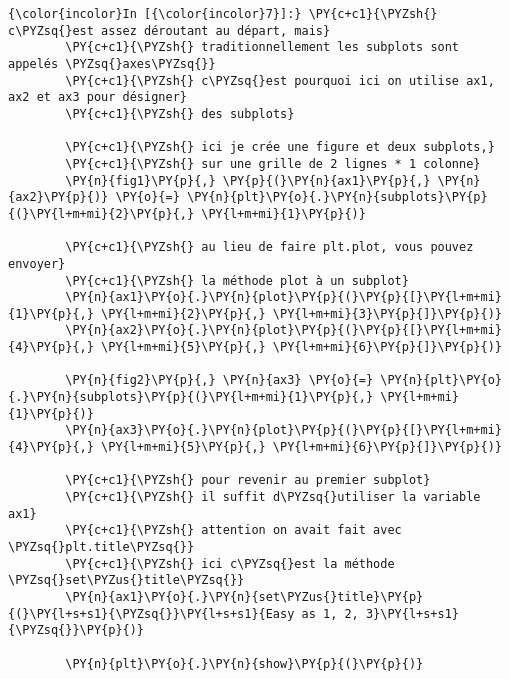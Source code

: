     \begin{Verbatim}[commandchars=\\\{\},frame=single,framerule=0.3mm,rulecolor=\color{cellframecolor}]
{\color{incolor}In [{\color{incolor}7}]:} \PY{c+c1}{\PYZsh{} c\PYZsq{}est assez déroutant au départ, mais}
        \PY{c+c1}{\PYZsh{} traditionnellement les subplots sont appelés \PYZsq{}axes\PYZsq{}}
        \PY{c+c1}{\PYZsh{} c\PYZsq{}est pourquoi ici on utilise ax1, ax2 et ax3 pour désigner}
        \PY{c+c1}{\PYZsh{} des subplots}
        
        \PY{c+c1}{\PYZsh{} ici je crée une figure et deux subplots,}
        \PY{c+c1}{\PYZsh{} sur une grille de 2 lignes * 1 colonne}
        \PY{n}{fig1}\PY{p}{,} \PY{p}{(}\PY{n}{ax1}\PY{p}{,} \PY{n}{ax2}\PY{p}{)} \PY{o}{=} \PY{n}{plt}\PY{o}{.}\PY{n}{subplots}\PY{p}{(}\PY{l+m+mi}{2}\PY{p}{,} \PY{l+m+mi}{1}\PY{p}{)}
        
        \PY{c+c1}{\PYZsh{} au lieu de faire plt.plot, vous pouvez envoyer}
        \PY{c+c1}{\PYZsh{} la méthode plot à un subplot}
        \PY{n}{ax1}\PY{o}{.}\PY{n}{plot}\PY{p}{(}\PY{p}{[}\PY{l+m+mi}{1}\PY{p}{,} \PY{l+m+mi}{2}\PY{p}{,} \PY{l+m+mi}{3}\PY{p}{]}\PY{p}{)}
        \PY{n}{ax2}\PY{o}{.}\PY{n}{plot}\PY{p}{(}\PY{p}{[}\PY{l+m+mi}{4}\PY{p}{,} \PY{l+m+mi}{5}\PY{p}{,} \PY{l+m+mi}{6}\PY{p}{]}\PY{p}{)}
        
        \PY{n}{fig2}\PY{p}{,} \PY{n}{ax3} \PY{o}{=} \PY{n}{plt}\PY{o}{.}\PY{n}{subplots}\PY{p}{(}\PY{l+m+mi}{1}\PY{p}{,} \PY{l+m+mi}{1}\PY{p}{)}
        \PY{n}{ax3}\PY{o}{.}\PY{n}{plot}\PY{p}{(}\PY{p}{[}\PY{l+m+mi}{4}\PY{p}{,} \PY{l+m+mi}{5}\PY{p}{,} \PY{l+m+mi}{6}\PY{p}{]}\PY{p}{)}
        
        \PY{c+c1}{\PYZsh{} pour revenir au premier subplot}
        \PY{c+c1}{\PYZsh{} il suffit d\PYZsq{}utiliser la variable ax1}
        \PY{c+c1}{\PYZsh{} attention on avait fait avec \PYZsq{}plt.title\PYZsq{}}
        \PY{c+c1}{\PYZsh{} ici c\PYZsq{}est la méthode \PYZsq{}set\PYZus{}title\PYZsq{}}
        \PY{n}{ax1}\PY{o}{.}\PY{n}{set\PYZus{}title}\PY{p}{(}\PY{l+s+s1}{\PYZsq{}}\PY{l+s+s1}{Easy as 1, 2, 3}\PY{l+s+s1}{\PYZsq{}}\PY{p}{)}
        
        \PY{n}{plt}\PY{o}{.}\PY{n}{show}\PY{p}{(}\PY{p}{)}
\end{Verbatim}


    \begin{center}
    \end{center}
    { \hspace*{\fill} \\}
    
